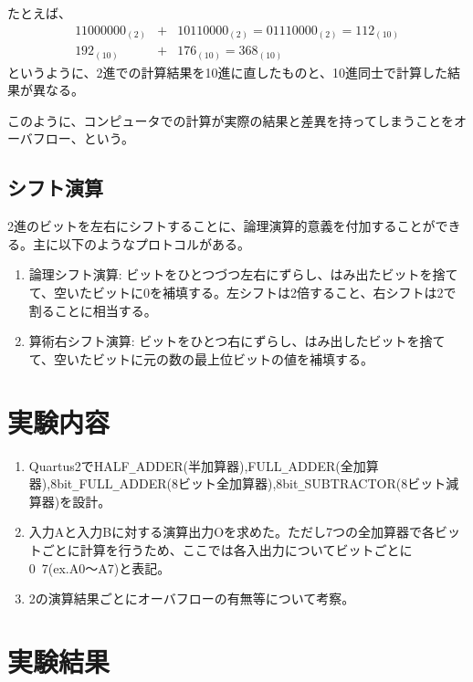\documentclass[11pt,a4j]{jsarticle}
\begin{document}
  たとえば、
  \begin{eqnarray}
  11000000_{(2)} &+& 10110000_{(2)} = 01110000_{(2)} = 112_{(10)} \nonumber \\
  192_{(10)} &+& 176_{(10)} = 368_{(10)} \nonumber
  \end{eqnarray}
  というように、2進での計算結果を10進に直したものと、10進同士で計算した結果が異なる。
  
  このように、コンピュータでの計算が実際の結果と差異を持ってしまうことをオーバフロー、という。
  
  \subsection{シフト演算}
  2進のビットを左右にシフトすることに、論理演算的意義を付加することができる。主に以下のようなプロトコルがある。
  \begin{enumerate}
  \item 論理シフト演算: ビットをひとつづつ左右にずらし、はみ出たビットを捨てて、空いたビットに0を補填する。左シフトは2倍すること、右シフトは2で割ることに相当する。
  \item 算術右シフト演算: ビットをひとつ右にずらし、はみ出したビットを捨てて、空いたビットに元の数の最上位ビットの値を補填する。
  \end{enumerate}
  
  
  
  
 \section{実験内容}
  
  \begin{enumerate}
  \item Quartus2でHALF\verb|_|ADDER(半加算器),FULL\verb|_|ADDER(全加算器),8bit\verb|_|FULL\verb|_|ADDER(8ビット全加算器),8bit\verb|_|SUBTRACTOR(8ビット減算器)を設計。
  \item 入力Aと入力Bに対する演算出力Oを求めた。ただし7つの全加算器で各ビットごとに計算を行うため、ここでは各入出力についてビットごとに0~7(ex.A0～A7)と表記。
  \item 2の演算結果ごとにオーバフローの有無等について考察。
  \end{enumerate}
  
  
 \section{実験結果}
  
\end{document}
